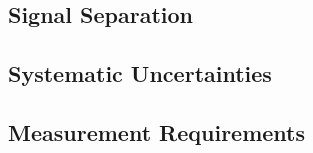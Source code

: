 \documentclass[12pt]{article}
\begin{document}
\subsection{Signal Separation}%
\label{sec:signal_separation}




\subsection{Systematic Uncertainties}%
\label{sec:systematics}



\subsection{Measurement Requirements} %
\label{requirements}


\newpage



%



%



%



%

 

\newpage
\def\bibfont{\footnotesize}
\setlength{\bibsep}{1pt}




\end{document}
